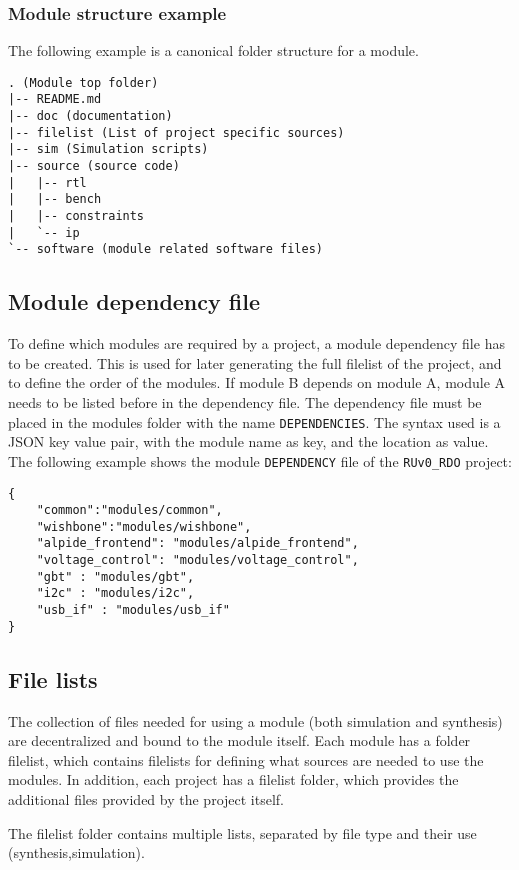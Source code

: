 \documentclass{scrartcl}
\begin{document}
\subsubsection{Module structure example}
The following example is a canonical folder structure for a module.

\begin{verbatim}
. (Module top folder)
|-- README.md
|-- doc (documentation)
|-- filelist (List of project specific sources)
|-- sim (Simulation scripts)
|-- source (source code)
|   |-- rtl
|   |-- bench
|   |-- constraints
|   `-- ip
`-- software (module related software files)
\end{verbatim}

\subsection{Module dependency file}
To define which modules are required by a project, a module dependency
file has to be created. This is used for later generating the full
filelist of the project, and to define the order of the modules. If
module B depends on module A, module A needs to be listed before in
the dependency file. The dependency file must be placed in the modules
folder with the name \verb|DEPENDENCIES|. The syntax used is a JSON
key value pair, with the module name as key, and the location as
value. The following example shows the module \verb|DEPENDENCY| file
of the \verb|RUv0_RDO| project:

\begin{verbatim}
{
    "common":"modules/common",
    "wishbone":"modules/wishbone",
    "alpide_frontend": "modules/alpide_frontend",
    "voltage_control": "modules/voltage_control",
    "gbt" : "modules/gbt",
    "i2c" : "modules/i2c",
    "usb_if" : "modules/usb_if"
}
\end{verbatim}

\subsection{File lists}
The collection of files needed for using a module (both simulation and
synthesis) are decentralized and bound to the module itself. Each
module has a folder filelist, which contains filelists for defining
what sources are needed to use the modules. In addition, each project
has a filelist folder, which provides the additional files provided by
the project itself.

The filelist folder contains multiple lists, separated by file type
and their use (synthesis,simulation).
\end{document}
